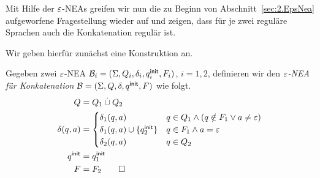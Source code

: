 \medskip

Mit Hilfe der $\varepsilon$-NEAs greifen wir nun die zu Beginn von Abschnitt~\ref{sec:2.EpsNea} aufgeworfene Fragestellung wieder auf und zeigen, dass für je zwei reguläre Sprachen auch die Konkatenation regulär ist.

Wir geben hierfür zunächst eine Konstruktion an.

\begin{Def}
Gegeben zwei $\varepsilon$-NEA $\mathcal{B}_i= (\Sigma, Q_i,\delta_i,q^\mathsf{init}_i,F_i)$, $i = 1,2$, definieren wir den \emph{$\varepsilon$-NEA für Konkatenation} $\mathcal{B}= (\Sigma, Q,\delta,q^\mathsf{init},F)$ wie folgt.
                \begin{align*}
                Q &= Q_1 \overset.\cup Q_2\\
                \delta(q,a) &=
                                \begin{cases}
                                        \delta_1(q,a) & q\in Q_1\land (q\notin F_1 \lor a\neq \varepsilon)\\
                                        \delta_1(q,a)\cup\{q^\mathsf{init}_2\} & q\in F_1\land a=\varepsilon\\
                                        \delta_2(q,a) & q\in Q_2
                                \end{cases}\\
                q^\mathsf{init} & = q^\mathsf{init}_1\\
                F &= F_2 \qedhere
                \end{align*}
\end{Def}

